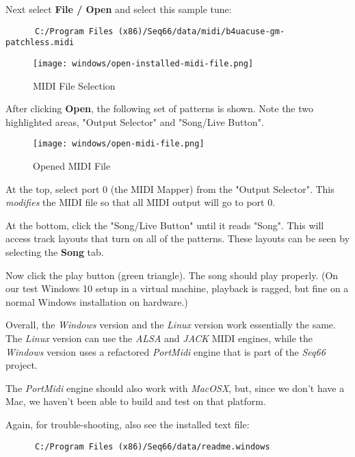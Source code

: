    Next select \textbf{File / Open} and select this sample tune:

   \begin{verbatim}
      C:/Program Files (x86)/Seq66/data/midi/b4uacuse-gm-patchless.midi
   \end{verbatim}

\begin{figure}[H]
   \centering 
   \texttt{[image: windows/open-installed-midi-file.png]}
   \caption{MIDI File Selection}
   \label{fig:windows_open_installed_midi_file}
\end{figure}

   After clicking \textbf{Open}, the following set of patterns is shown.
   Note the two highlighted areas, "Output Selector" and "Song/Live Button".

\begin{figure}[H]
   \centering 
   \texttt{[image: windows/open-midi-file.png]}
   \caption{Opened MIDI File}
   \label{fig:windows_open_midi_file}
\end{figure}

   At the top, select port 0 (the MIDI Mapper) from the "Output Selector".
   This \textsl{modifies} the MIDI file so that all MIDI
   output will go to port 0.

   At the bottom, click the "Song/Live Button" until it reads "Song".
   This will access track layouts that turn on all of the patterns.
   These layouts can be seen by selecting the \textbf{Song} tab.

   Now click the play button (green triangle).
   The song should play properly.
   (On our test Windows 10 setup in a virtual machine, playback is ragged,
   but fine on a normal Windows installation on hardware.)

   Overall, the \textsl{Windows} version and the \textsl{Linux} version
   work essentially the same. The \textsl{Linux} version can use the
   \textsl{ALSA} and \textsl{JACK} MIDI engines, while the \textsl{Windows}
   version uses a refactored \textsl{PortMidi} engine that is part of the
   \textsl{Seq66} project.

   The \textsl{PortMidi} engine should also work with \textsl{MacOSX}, but,
   since we don't have a Mac, we haven't been able to build and test
   on that platform.

   Again, for trouble-shooting, also see the installed text file:

   \begin{verbatim}
      C:/Program Files (x86)/Seq66/data/readme.windows
   \end{verbatim}

